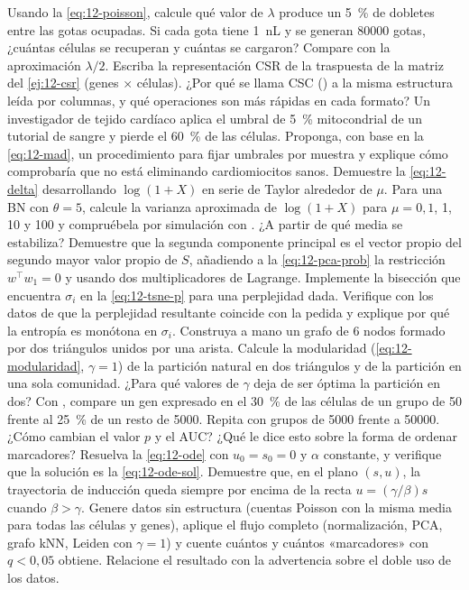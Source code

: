 \begin{ejercicios}
 Usando la \cref{eq:12-poisson}, calcule qué valor de $\lambda$ produce un \SI{5}{\percent} de dobletes entre las gotas ocupadas. Si cada gota tiene \SI{1}{nL} y se generan \num{80000} gotas, ¿cuántas células se recuperan y cuántas se cargaron? Compare con la aproximación $\lambda/2$.
 Escriba la representación CSR de la traspuesta de la matriz del \cref{ej:12-csr} (genes $\times$ células). ¿Por qué se llama CSC () a la misma estructura leída por columnas, y qué operaciones son más rápidas en cada formato?
 Un investigador de tejido cardíaco aplica el umbral de \SI{5}{\percent} mitocondrial de un tutorial de sangre y pierde el \SI{60}{\percent} de las células. Proponga, con base en la \cref{eq:12-mad}, un procedimiento para fijar umbrales por muestra y explique cómo comprobaría que no está eliminando cardiomiocitos sanos.
 Demuestre la \cref{eq:12-delta} desarrollando $\log(1+X)$ en serie de Taylor alrededor de $\mu$. Para una BN con $\theta=5$, calcule la varianza aproximada de $\log(1+X)$ para $\mu=0{,}1$, 1, 10 y 100 y compruébela por simulación con . ¿A partir de qué media se estabiliza?
 Demuestre que la segunda componente principal es el vector propio del segundo mayor valor propio de $S$, añadiendo a la \cref{eq:12-pca-prob} la restricción $w^\top w_1=0$ y usando dos multiplicadores de Lagrange.
 Implemente la bisección que encuentra $\sigma_i$ en la \cref{eq:12-tsne-p} para una perplejidad dada. Verifique con los datos de  que la perplejidad resultante coincide con la pedida y explique por qué la entropía es monótona en $\sigma_i$.
 Construya a mano un grafo de 6 nodos formado por dos triángulos unidos por una arista. Calcule la modularidad (\cref{eq:12-modularidad}, $\gamma=1$) de la partición natural en dos triángulos y de la partición en una sola comunidad. ¿Para qué valores de $\gamma$ deja de ser óptima la partición en dos?
 Con , compare un gen expresado en el \SI{30}{\percent} de las células de un grupo de 50 frente al \SI{25}{\percent} de un resto de \num{5000}. Repita con grupos de \num{5000} frente a \num{50000}. ¿Cómo cambian el valor $p$ y el AUC? ¿Qué le dice esto sobre la forma de ordenar marcadores?
 Resuelva la \cref{eq:12-ode} con $u_0=s_0=0$ y $\alpha$ constante, y verifique que la solución es la \cref{eq:12-ode-sol}. Demuestre que, en el plano $(s,u)$, la trayectoria de inducción queda siempre por encima de la recta $u=(\gamma/\beta)s$ cuando $\beta>\gamma$.
 Genere datos sin estructura (cuentas Poisson con la misma media para todas las células y genes), aplique el flujo completo (normalización, PCA, grafo kNN, Leiden con $\gamma=1$) y cuente cuántos  y cuántos «marcadores» con $q<0{,}05$ obtiene. Relacione el resultado con la advertencia sobre el doble uso de los datos.
\end{ejercicios}

